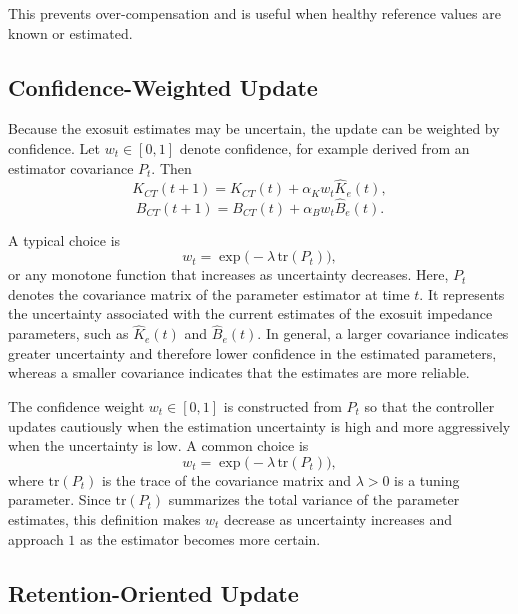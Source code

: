 \documentclass[11pt]{article}
\begin{document}
This prevents over-compensation and is useful when healthy reference values are known or estimated.

\subsection{Confidence-Weighted Update}

Because the exosuit estimates may be uncertain, the update can be weighted by confidence. Let \(w_t \in [0,1]\) denote confidence, for example derived from an estimator covariance \(P_t\). Then
\begin{equation}
K_{CT}(t+1) = K_{CT}(t) + \alpha_K w_t \hat{K}_e(t),
\label{eq:conf_K}
\end{equation}
\begin{equation}
B_{CT}(t+1) = B_{CT}(t) + \alpha_B w_t \hat{B}_e(t).
\label{eq:conf_B}
\end{equation}

A typical choice is
\begin{equation}
w_t = \exp\bigl(-\lambda \, \mathrm{tr}(P_t)\bigr),
\end{equation}
or any monotone function that increases as uncertainty decreases. Here, \(P_t\) denotes the covariance matrix of the parameter estimator at time \(t\). It represents the uncertainty associated with the current estimates of the exosuit impedance parameters, such as \(\hat{K}_e(t)\) and \(\hat{B}_e(t)\). In general, a larger covariance indicates greater uncertainty and therefore lower confidence in the estimated parameters, whereas a smaller covariance indicates that the estimates are more reliable.

The confidence weight \(w_t \in [0,1]\) is constructed from \(P_t\) so that the controller updates cautiously when the estimation uncertainty is high and more aggressively when the uncertainty is low. A common choice is
\begin{equation}
w_t = \exp\bigl(-\lambda\,\mathrm{tr}(P_t)\bigr),
\end{equation}
where \(\mathrm{tr}(P_t)\) is the trace of the covariance matrix and \(\lambda > 0\) is a tuning parameter. Since \(\mathrm{tr}(P_t)\) summarizes the total variance of the parameter estimates, this definition makes \(w_t\) decrease as uncertainty increases and approach \(1\) as the estimator becomes more certain.

\subsection{Retention-Oriented Update}
\end{document}
